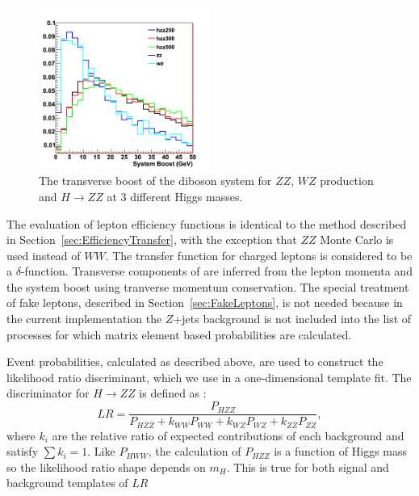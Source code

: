 \begin{figure}[!htbp]                                                                                         
\begin{center}                                                                                                
\includegraphics[width=0.5\textwidth]{figures/hzz_boost_allj.png}                                                      
\caption{The transverse boost of the diboson system for $ZZ$, $WZ$ production and $H \rightarrow ZZ$ at 3 different Higgs masses.} 
\label{fig:zzboost}                                                                                           
\end{center}                                                                                                  
\end{figure}  
 
The evaluation of lepton efficiency functions is identical to the method described in Section~\ref{sec:EfficiencyTransfer}, with the 
exception that $ZZ$ Monte Carlo is used instead of $WW$. The transfer function for charged leptons is considered to be a $\delta$-function.
Transverse components of \met are inferred from the lepton momenta and the system boost using tranverse momentum conservation.
The special treatment of fake leptons, described in Section~\ref{sec:FakeLeptons}, is not needed because in the current implementation
the $Z$+jets background is not included into the list of processes for which matrix element based probabilities are calculated. 

Event probabilities, calculated as described above, are used to construct the likelihood ratio discriminant, 
which we use in a one-dimensional template fit.  The discriminator for $H\rightarrow ZZ$ is defined as :
\begin{equation}
\label{eqn:LRHZZ}
LR = \frac { P_{HZZ}} { P_{HZZ} + k_{WW} P_{WW}+ k_{WZ} P_{WZ} + k_{ZZ} P_{ZZ}},
\end{equation}
where $k_{i}$ are the relative ratio of expected contributions of each background and satisfy $\sum k_{i} =1$.
Like $P_{HWW}$, the calculation of $P_{HZZ}$ is a function of Higgs mass so the likelihood ratio shape depends on $m_H$. 
This is true for both signal and background templates of $LR$
